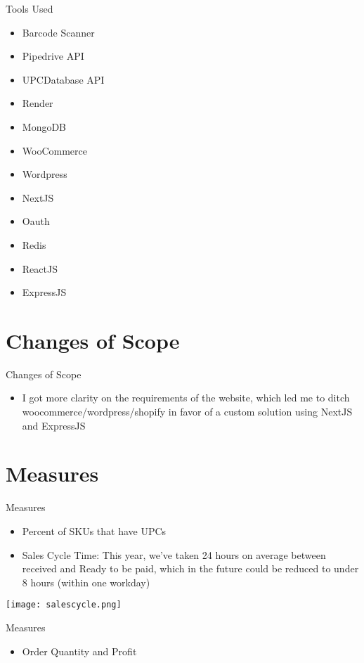 \documentclass[aspectratio=1610]{beamer}
\begin{document}
\begin{frame}{Tools Used}
    \begin{itemize}
        \item Barcode Scanner
        \item Pipedrive API
        \item UPCDatabase API
        \item Render
        \item MongoDB
        \item WooCommerce
        \item Wordpress
        \item NextJS
        \item Oauth
        \item Redis
        \item ReactJS
        \item ExpressJS
    \end{itemize}
\end{frame}
\section{Changes of Scope}
\begin{frame}{Changes of Scope}
    \begin{itemize}
        \item  I got more clarity on the requirements of the website, which led me to ditch woocommerce/wordpress/shopify in favor of a custom solution using NextJS and ExpressJS
    \end{itemize}
\end{frame}
\section{Measures}
\begin{frame}{Measures}
    \begin{itemize}
        \item Percent of SKUs that have UPCs 
        \item Sales Cycle Time: This year, we've taken 24 hours on average between received and Ready to be paid, which in the future could be reduced to under 8 hours (within one workday) 
    \end{itemize}
    \texttt{[image: salescycle.png]}

\end{frame}
\begin{frame}{Measures}
    \begin{itemize}
        \item Order Quantity and Profit
    \end{itemize}

\end{frame}
\end{document}
